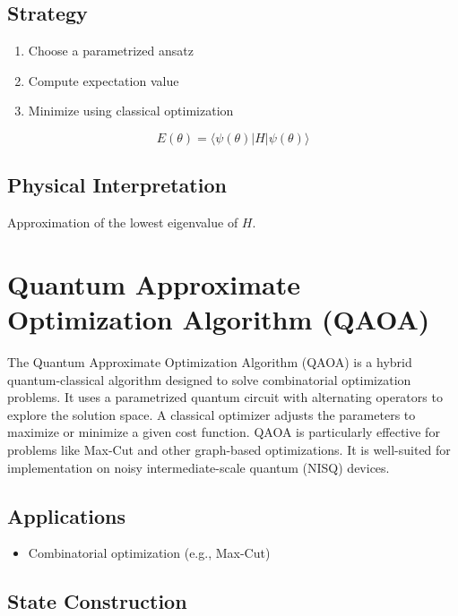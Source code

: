 \subsection*{Strategy}

\begin{enumerate}
\item Choose a parametrized ansatz
\item Compute expectation value
\item Minimize using classical optimization
\end{enumerate}

\[
E(\theta) = \langle \psi(\theta) | H | \psi(\theta) \rangle
\]

\subsection*{Physical Interpretation}

Approximation of the lowest eigenvalue of $H$.

\vspace{0.5cm}

\section{Quantum Approximate Optimization Algorithm (QAOA)}

The Quantum Approximate Optimization Algorithm (QAOA) is a hybrid quantum-classical algorithm 
designed to solve combinatorial optimization problems. It uses a parametrized quantum circuit 
with alternating operators to explore the solution space. A classical optimizer adjusts the 
parameters to maximize or minimize a given cost function. QAOA is particularly effective for 
problems like Max-Cut and other graph-based optimizations. It is well-suited for implementation 
on noisy intermediate-scale quantum (NISQ) devices.

\subsection*{Applications}

\begin{itemize}
\item Combinatorial optimization (e.g., Max-Cut)
\end{itemize}

\subsection{State Construction}

